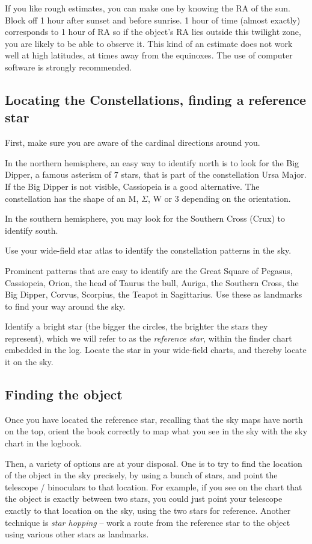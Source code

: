 If you like rough estimates, you can make one by knowing the RA of the
sun. Block off 1 hour after sunset and before sunrise. 1 hour of time
(almost exactly) corresponds to 1 hour of RA so if the object's RA
lies outside this twilight zone, you are likely to be able to observe
it. This kind of an estimate does not work well at high latitudes, at
times away from the equinoxes. The use of computer software is
strongly recommended.

\subsection{Locating the Constellations, finding a reference star}
First, make sure you are aware of the cardinal directions around
you. 

In the northern hemisphere, an easy way to identify north is to look
for the Big Dipper, a famous asterism of 7 stars, that is part of the
constellation Ursa Major. If the Big Dipper is not visible, Cassiopeia
is a good alternative. The constellation has the shape of an M,
$\Sigma$, W or 3 depending on the orientation.

In the southern hemisphere, you may look for the Southern Cross (Crux)
to identify south.

Use your wide-field star atlas to identify the constellation patterns
in the sky.

Prominent patterns that are easy to identify are the Great Square of
Pegasus, Cassiopeia, Orion, the head of Taurus the bull, Auriga, the
Southern Cross, the Big Dipper, Corvus, Scorpius, the Teapot in
Sagittarius. Use these as landmarks to find your way around the sky.

Identify a bright star (the bigger the circles, the brighter the stars
they represent), which we will refer to as the \emph{reference star},
within the finder chart embedded in the log. Locate the star in your
wide-field charts, and thereby locate it on the sky.

\subsection{Finding the object}

Once you have located the reference star, recalling that the sky maps
have north on the top, orient the book correctly to map what you see
in the sky with the sky chart in the logbook.

Then, a variety of options are at your disposal. One is to try to find
the location of the object in the sky precisely, by using a bunch of
stars, and point the telescope / binoculars to that location. For
example, if you see on the chart that the object is exactly between
two stars, you could just point your telescope exactly to that
location on the sky, using the two stars for reference. Another
technique is \emph{star hopping} -- work a route from the reference
star to the object using various other stars as landmarks.

